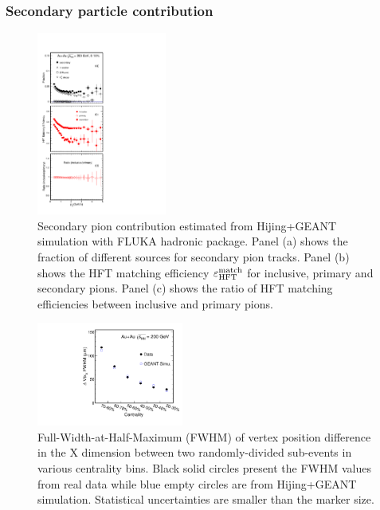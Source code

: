 \documentclass[%
 reprint,	
 amsmath,amssymb,
 aps,
 prc,
]{revtex4-1}
\begin{document}
\subsubsection{Secondary particle contribution}
\label{correction:hft:secondary}

\begin{figure}[h]
\centering
\includegraphics[width=0.38\textwidth, angle = 0]{fig/Fraction_Pion_2.pdf}
  \caption{Secondary pion contribution estimated from Hijing+GEANT simulation with FLUKA hadronic package. Panel (a) shows the fraction of different sources for secondary pion tracks. Panel (b) shows the HFT matching efficiency $\varepsilon_{\rm HFT}^{\rm match}$ for inclusive, primary and secondary pions. Panel (c) shows the ratio of HFT matching efficiencies between inclusive and primary pions.}
\label{fig:Fraction_Pion} 
\end{figure}

\begin{figure}
\centering
\includegraphics[width=0.43\textwidth]{fig/vtxX_vsCent.pdf}
\caption{Full-Width-at-Half-Maximum (FWHM) of vertex position difference in the X dimension between two randomly-divided sub-events in various centrality bins. Black solid circles present the FWHM values from real data while blue empty circles are from Hijing+GEANT simulation. Statistical uncertainties are smaller than the marker size.}
\label{fig:vtxX_vsCent} 
\end{figure}
\end{document}
